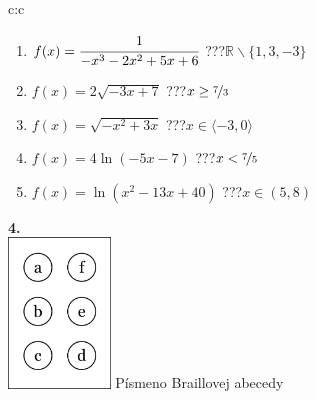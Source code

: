\documentclass[10pt]{report}
\begin{document}
\begin{tabular}{c:c}
\begin{minipage}[c][99mm][t]{0.49\linewidth}
\begin{center}
\begin{minipage}{0.77\linewidth}
\begin{center}
\begin{varwidth}{\textwidth}
\begin{enumerate}
\item $f(x)=\cfrac{1}{-x^3-2x^2+5x+6}$\quad \dotfill\; ???\;\dotfill \quad $\mathbb{R}\smallsetminus\{1,3,-3\}$
\item $f(x)=2\sqrt{-3x+7}$\quad \dotfill\; ???\;\dotfill \quad $x\geq\nicefrac{7}{3}$
\item $f(x)=\sqrt{-x^2+3x}$\quad \dotfill\; ???\;\dotfill \quad $x\in\langle-3 , 0\rangle$
\item $f(x)=4\ln{(-5x-7)}$\quad \dotfill\; ???\;\dotfill \quad $x<\nicefrac{7}{5}$
\item $f(x)=\ln{(x^2-13x+40)}$\quad \dotfill\; ???\;\dotfill \quad $x\in(5 , 8)$
\end{enumerate}
\end{varwidth}
\end{center}
\end{minipage}
\begin{minipage}{0.20\linewidth}
\begin{center}
{\Huge\bfseries 4.} \\[2mm]
\includegraphics[height=40mm]{../images/braille.png}
{\small Písmeno Braillovej abecedy}
\end{center}
\end{minipage}
\end{center}
\end{minipage}
%
\end{tabular}
\newpage
\thispagestyle{empty}
\end{document}
